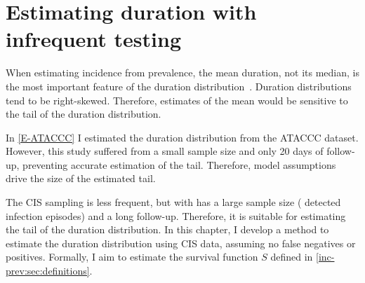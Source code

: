 \documentclass[thesis.tex]{subfiles}
\begin{document}
\ifSubfilesClassLoaded{


\setcounter{chapter}{4}
}

\chapter{Estimating duration with infrequent testing} \label{perf-test}

When estimating incidence from prevalence, the mean duration, not its median, is the most important feature of the duration distribution~\autocite{freemanPrevalence}.
Duration distributions tend to be right-skewed.
Therefore, estimates of the mean would be sensitive to the tail of the duration distribution.

In \cref{E-ATACCC} I estimated the duration distribution from the ATACCC dataset.
However, this study suffered from a small sample size and only 20 days of follow-up, preventing accurate estimation of the tail.
Therefore, model assumptions drive the size of the estimated tail.

The CIS sampling is less frequent, but with has a large sample size ( detected infection episodes) and a long follow-up.
Therefore, it is suitable for estimating the tail of the duration distribution.
In this chapter, I develop a method to estimate the duration distribution using CIS data, assuming no false negatives or positives.
Formally, I aim to estimate the survival function $S$ defined in \cref{inc-prev:sec:definitions}.
\end{document}
